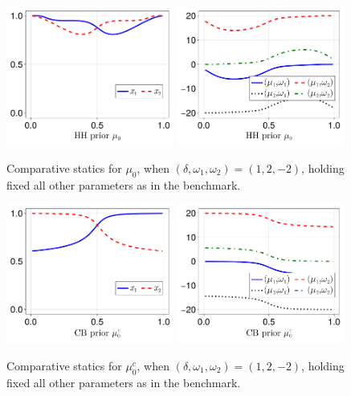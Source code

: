 \documentclass[12pt,a4paper]{article}
\begin{document}
\begin{figure}[H]
\centering
\includegraphics[width=0.49\textwidth]{figures/V8/γ_10/fig_optimal_π_across_μ_0_ω_1_2_ω_2_-2_δ_1.0_.pdf}
\includegraphics[width=0.49\textwidth]{figures/V8/γ_10/fig_posterior_across_μ_0_ω_1_2_ω_2_-2_δ_1.0_.pdf}
\caption{Comparative statics for $\mu_0$, when $(\delta,\omega_1,\omega_2)=(1,2,-2)$, holding fixed all other parameters as in the benchmark.}
\label{FigureA13}
\end{figure}

\begin{figure}[H]
\centering
\includegraphics[width=0.49\textwidth]{figures/V8/γ_10/fig_optimal_π_across_μ_0_c_ω_1_2_ω_2_-2_δ_1.0_.pdf}
\includegraphics[width=0.49\textwidth]{figures/V8/γ_10/fig_posterior_across_μ_0_c_ω_1_2_ω_2_-2_δ_1.0_.pdf}
\caption{Comparative statics for $\mu_0^c$, when $(\delta,\omega_1,\omega_2)=(1,2,-2)$, holding fixed all other parameters as in the benchmark.}
\label{FigureA14}
\end{figure}
\end{document}
